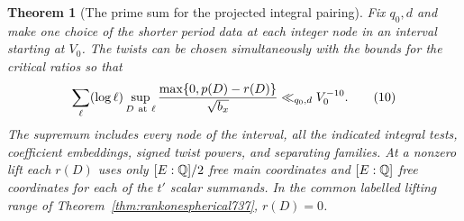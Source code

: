 \documentclass[a4paper,11pt]{article}
\newtheorem{theorem}[proposition]{Theorem}
\theoremstyle{definition}
\theoremstyle{remark}
\numberwithin{equation}{section}
\begin{document}
\begin{theorem}[The prime sum for the projected integral pairing]
\leavevmode\label{thm:projectedcups742}
Fix \(q_0,d\) and make one choice of the shorter period data at
each integer node in an interval starting at \(V_0\). The twists
can be chosen simultaneously with the bounds for the critical
ratios so that
\[
 \sum_\ell(\log\ell)\sup_{D\ {\rm at}\ \ell}
          \frac{\max\{0,p(D)-r(D)\}}{\sqrt{b_x}}
                    \ll_{q_0,d} V_0^{-10}.
 \tag{10}\label{eq:projectedcups742}
\]
The supremum includes every node of the interval, all the
indicated integral tests, coefficient embeddings, signed twist
powers, and separating families. At a nonzero lift each \(r(D)\)
uses only \([E:\mathbb Q]/2\) free main coordinates and
\([E:\mathbb Q]\) free coordinates for each of the \(t'\) scalar
summands. In the common labelled lifting range of
Theorem~\ref{thm:rankonespherical737}, \(r(D)=0\).
\end{theorem}
\end{document}
